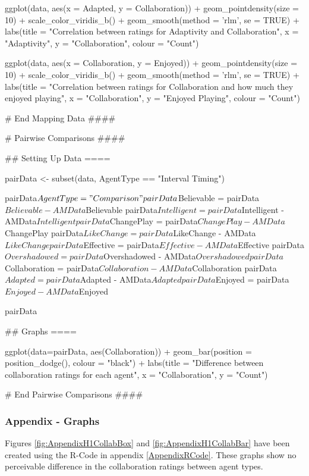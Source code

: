 \documentclass{IEEEtran}
\begin{document}
\begin{verbnobox}[\fontsize{10pt}{10pt}\selectfont]
ggplot(data, aes(x = Adapted, y = Collaboration)) +
  geom_pointdensity(size = 10) +
  scale_color_viridis_b() + 
  geom_smooth(method = 'rlm', se = TRUE) +
  labs(title = "Correlation between ratings for Adaptivity and Collaboration",
       x = "Adaptivity", y = "Collaboration", colour = "Count")

ggplot(data, aes(x = Collaboration, y = Enjoyed)) +
  geom_pointdensity(size = 10) +
  scale_color_viridis_b() + 
  geom_smooth(method = 'rlm', se = TRUE) +
  labs(title = "Correlation between ratings for Collaboration and how much they enjoyed
  playing",
       x = "Collaboration", y = "Enjoyed Playing", colour = "Count")

# End Mapping Data ####

# Pairwise Comparisons ####

## Setting Up Data ====

pairData <- subset(data, AgentType == "Interval Timing")

pairData$AgentType = "Comparison"
pairData$Believable = pairData$Believable - AMData$Believable
pairData$Intelligent = pairData$Intelligent - AMData$Intelligent
pairData$ChangePlay = pairData$ChangePlay - AMData$ChangePlay
pairData$LikeChange = pairData$LikeChange - AMData$LikeChange
pairData$Effective = pairData$Effective - AMData$Effective
pairData$Overshadowed = pairData$Overshadowed - AMData$Overshadowed
pairData$Collaboration = pairData$Collaboration - AMData$Collaboration
pairData$Adapted = pairData$Adapted - AMData$Adapted
pairData$Enjoyed = pairData$Enjoyed - AMData$Enjoyed

pairData

## Graphs ====

ggplot(data=pairData, aes(Collaboration)) +
  geom_bar(position = position_dodge(), colour = "black") +
  labs(title = "Difference between collaboration ratings for each agent",
       x = "Collaboration", y = "Count")

# End Pairwise Comparisons ####
\end{verbnobox}

\subsubsection{Appendix - Graphs}
\label{AppendixGraphs}

Figures \ref{fig:AppendixH1CollabBox} and \ref{fig:AppendixH1CollabBar} have been created using the R-Code in appendix \ref{AppendixRCode}. These graphs show no perceivable difference in the collaboration ratings between agent types.
\end{document}
